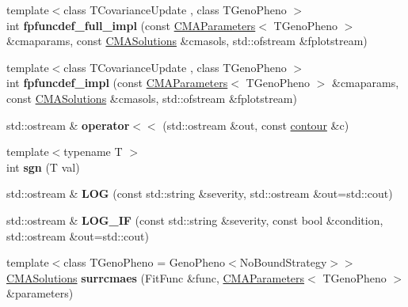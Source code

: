 \begin{DoxyCompactItemize}
\item 
\hypertarget{namespacelibcmaes_aa16dc3a011a52fe76a03ccbaf6828900}{{\footnotesize template$<$class T\+Covariance\+Update , class T\+Geno\+Pheno $>$ }\\int {\bfseries fpfuncdef\+\_\+full\+\_\+impl} (const \hyperlink{classlibcmaes_1_1CMAParameters}{C\+M\+A\+Parameters}$<$ T\+Geno\+Pheno $>$ \&cmaparams, const \hyperlink{classlibcmaes_1_1CMASolutions}{C\+M\+A\+Solutions} \&cmasols, std\+::ofstream \&fplotstream)}\label{namespacelibcmaes_aa16dc3a011a52fe76a03ccbaf6828900}

\item 
\hypertarget{namespacelibcmaes_acf89ddd530e5080f1ad12c7bb039d958}{{\footnotesize template$<$class T\+Covariance\+Update , class T\+Geno\+Pheno $>$ }\\int {\bfseries fpfuncdef\+\_\+impl} (const \hyperlink{classlibcmaes_1_1CMAParameters}{C\+M\+A\+Parameters}$<$ T\+Geno\+Pheno $>$ \&cmaparams, const \hyperlink{classlibcmaes_1_1CMASolutions}{C\+M\+A\+Solutions} \&cmasols, std\+::ofstream \&fplotstream)}\label{namespacelibcmaes_acf89ddd530e5080f1ad12c7bb039d958}

\item 
\hypertarget{namespacelibcmaes_a0560798efe85d285c3b84dae8ebbab32}{std\+::ostream \& {\bfseries operator$<$$<$} (std\+::ostream \&out, const \hyperlink{classlibcmaes_1_1contour}{contour} \&c)}\label{namespacelibcmaes_a0560798efe85d285c3b84dae8ebbab32}

\item 
\hypertarget{namespacelibcmaes_a3e5bebc3c546618a1a690e719f241f5c}{{\footnotesize template$<$typename T $>$ }\\int {\bfseries sgn} (T val)}\label{namespacelibcmaes_a3e5bebc3c546618a1a690e719f241f5c}

\item 
\hypertarget{namespacelibcmaes_a16d45e47c7b936252e380cfbe6809c99}{std\+::ostream \& {\bfseries L\+O\+G} (const std\+::string \&severity, std\+::ostream \&out=std\+::cout)}\label{namespacelibcmaes_a16d45e47c7b936252e380cfbe6809c99}

\item 
\hypertarget{namespacelibcmaes_a3209b3dbcdada9d81d357dedf066b975}{std\+::ostream \& {\bfseries L\+O\+G\+\_\+\+I\+F} (const std\+::string \&severity, const bool \&condition, std\+::ostream \&out=std\+::cout)}\label{namespacelibcmaes_a3209b3dbcdada9d81d357dedf066b975}

\item 
\hypertarget{namespacelibcmaes_ad56249a36fb0f4458e2dba6b9294d79c}{{\footnotesize template$<$class T\+Geno\+Pheno  = Geno\+Pheno$<$\+No\+Bound\+Strategy$>$$>$ }\\\hyperlink{classlibcmaes_1_1CMASolutions}{C\+M\+A\+Solutions} {\bfseries surrcmaes} (Fit\+Func \&func, \hyperlink{classlibcmaes_1_1CMAParameters}{C\+M\+A\+Parameters}$<$ T\+Geno\+Pheno $>$ \&parameters)}\label{namespacelibcmaes_ad56249a36fb0f4458e2dba6b9294d79c}

\end{DoxyCompactItemize}


